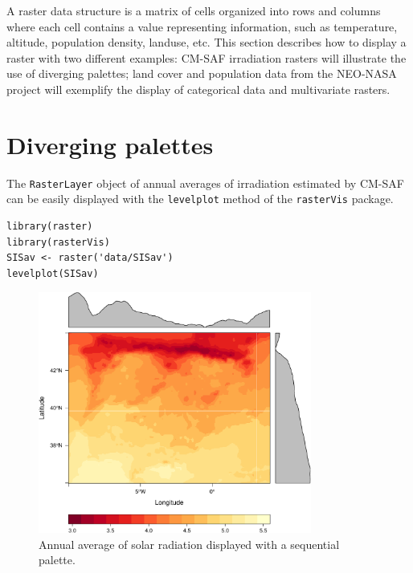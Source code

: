 

A raster data structure is a matrix of cells organized into rows
and columns where each cell contains a value representing
information, such as temperature, altitude, population density,
landuse, etc.  This section describes how to display a raster with
two different examples: CM-SAF irradiation rasters will illustrate
the use of diverging palettes; land cover and population data from
the NEO-NASA project will exemplify the display of categorical
data and multivariate rasters.

\section{Diverging palettes}
\label{sec-1}



The \texttt{RasterLayer} object of annual averages of irradiation
estimated by CM-SAF can be easily displayed with the \texttt{levelplot}
method of the \texttt{rasterVis} package.


\lstset{language=R}
\begin{lstlisting}
library(raster)
library(rasterVis)
SISav <- raster('data/SISav')
levelplot(SISav)
\end{lstlisting}

\begin{figure}[h!]
\centering
\includegraphics[width=0.8\textwidth]{figs/leveplotSISavOrig.pdf}
\caption{\label{fig:levelplotCMSAF}Annual average of solar radiation displayed with a sequential palette.}
\end{figure}

